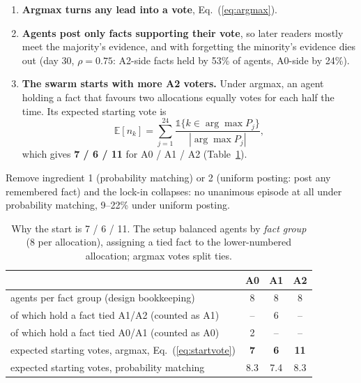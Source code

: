 \documentclass[10pt,a4paper]{article}
\begin{document}
\begin{enumerate}\itemsep1pt
\item \textbf{Argmax turns any lead into a vote}, Eq.~(\ref{eq:argmax}).
\item \textbf{Agents post only facts supporting their vote}, so later readers mostly meet
  the majority's evidence, and with forgetting the minority's evidence dies out
  (day 30, $\rho = 0.75$: A2-side facts held by 53\% of agents, A0-side by 24\%).
\item \textbf{The swarm starts with more A2 voters.} Under argmax, an agent holding a fact
  that favours two allocations equally votes for each half the time. Its expected
  starting vote is
  \begin{equation}\label{eq:startvote}
  \mathbb{E}[n_k] = \sum_{j=1}^{24} \frac{\mathbb{1}\{k \in \arg\max P_j\}}{|\arg\max P_j|},
  \end{equation}
  which gives \textbf{7 / 6 / 11} for A0 / A1 / A2 (Table~\ref{tab:start}).
\end{enumerate}
Remove ingredient 1 (probability matching) or 2 (uniform posting: post any remembered
fact) and the lock-in collapses: no unanimous episode at all under probability matching,
9--22\% under uniform posting.

\begin{table}[H]
\centering\small
\caption{Why the start is 7 / 6 / 11. The setup balanced agents by \emph{fact group}
(8 per allocation), assigning a tied fact to the lower-numbered allocation; argmax votes
split ties.}
\label{tab:start}
\begin{tabular}{lccc}
\toprule
 & A0 & A1 & A2 \\
\midrule
agents per fact group (design bookkeeping) & 8 & 8 & 8 \\
\quad of which hold a fact tied A1/A2 (counted as A1) & -- & 6 & -- \\
\quad of which hold a fact tied A0/A1 (counted as A0) & 2 & -- & -- \\
expected starting votes, argmax, Eq.~(\ref{eq:startvote}) & \textbf{7} & \textbf{6} & \textbf{11} \\
expected starting votes, probability matching & 8.3 & 7.4 & 8.3 \\
\bottomrule
\end{tabular}
\end{table}
\end{document}
